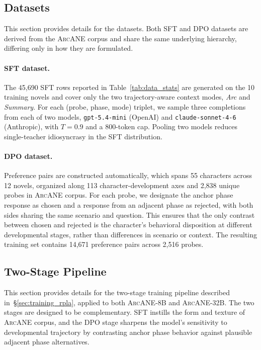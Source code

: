 \documentclass{llmxive}
\providecommand{\ours}{\textsc{ArcANE}}
\begin{document}
\subsection{Datasets}
\label{app:datasets_details}

This section provides details for the datasets. Both SFT and DPO datasets are derived from the \ours{} corpus and share the same underlying hierarchy, differing only in how they are formulated.

\paragraph{SFT dataset.}

The 45{,}690 SFT rows reported in Table~\ref{tab:data_stats} are generated on the 10 training novels and cover only the two trajectory-aware context modes, \emph{Arc} and \emph{Summary}. For each (probe, phase, mode) triplet, we sample three completions from each of two models, \texttt{gpt-5.4-mini} (OpenAI) and \texttt{claude-sonnet-4-6} (Anthropic), with $T=0.9$ and a 800-token cap. Pooling two models reduces single-teacher idiosyncrasy in the SFT distribution.

\paragraph{DPO dataset.}

Preference pairs are constructed automatically, which spans 55 characters across 12 novels, organized along 113 character-development axes and 2{,}838 unique probes in \ours{} corpus. For each probe, we designate the anchor phase response as chosen and a response from an adjacent phase as rejected, with both sides sharing the same scenario and question. This ensures that the only contrast between chosen and rejected is the character's behavioral disposition at different developmental stages, rather than differences in scenario or context. The resulting training set contains 14{,}671 preference pairs across 2{,}516 probes.


\subsection{Two-Stage Pipeline}
\label{app:training_pipeline}
This section provides details for the two-stage training pipeline described in~\S\ref{sec:training_rpla}, applied to both \ours{}-8B and \ours{}-32B. The two stages are designed to be complementary. SFT instills the form and texture of \ours{} corpus, and the DPO stage sharpens the model's sensitivity to developmental trajectory by contrasting anchor phase behavior against plausible adjacent phase alternatives.
\end{document}
